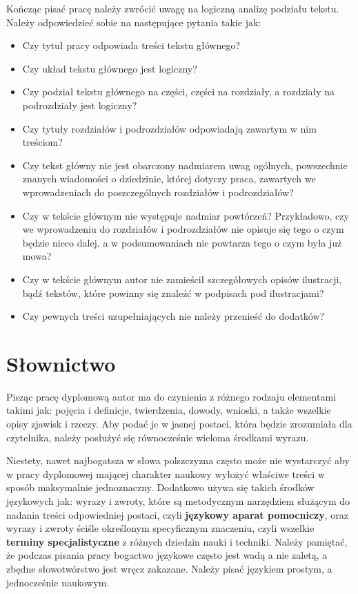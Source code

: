 Kończąc pisać pracę należy zwrócić uwagę na logiczną analizę podziału tekstu. Należy odpowiedzieć sobie na następujące pytania takie jak:
\begin{itemize}
	\item Czy tytuł pracy odpowiada treści tekstu głównego? 
	\item Czy układ tekstu głównego jest logiczny?
	\item Czy podział tekstu głównego na części, części na rozdziały, a rozdziały na podrozdziały jest logiczny?
	\item Czy tytuły rozdziałów i podrozdziałów odpowiadają zawartym w nim treściom?
	\item Czy tekst główny nie jest obarczony nadmiarem uwag ogólnych, powszechnie znanych wiadomości o dziedzinie, której dotyczy praca, zawartych we wprowadzeniach do poszczególnych rozdziałów i podrozdziałów?
	\item Czy w tekście głównym nie występuje nadmiar powtórzeń? Przykładowo, czy we wprowadzeniu do rozdziałów i podrozdziałów nie opisuje się tego o czym będzie nieco dalej, a w podsumowaniach nie powtarza tego o czym była już mowa?
	\item Czy w tekście głównym autor nie zamieścił szczegółowych opisów ilustracji, bądź tekstów, które powinny się znaleźć w podpisach pod ilustracjami?
	\item Czy pewnych treści uzupełniających nie należy przenieść do dodatków?
\end{itemize} 
\section{Słownictwo}
Pisząc pracę dyplomową autor ma do czynienia z różnego rodzaju elementami takimi jak: pojęcia i definicje, twierdzenia, dowody, wnioski, a także wszelkie opisy zjawisk i rzeczy. Aby podać je w jasnej postaci, która będzie zrozumiała dla czytelnika, należy posłużyć się równocześnie wieloma środkami wyrazu.

Niestety, nawet najbogatsza w słowa polszczyzna często może nie wystarczyć aby w pracy dyplomowej mającej charakter naukowy wyłożyć właściwe treści w sposób maksymalnie jednoznaczny. Dodatkowo używa się takich środków językowych jak: wyrazy i zwroty, które są metodycznym narzędziem służącym do nadania treści odpowiedniej postaci, czyli \textbf{językowy aparat pomocniczy}, oraz wyrazy i zwroty ściśle określonym specyficznym znaczeniu, czyli wszelkie \textbf{terminy specjalistyczne} z różnych dziedzin nauki i techniki. Należy pamiętać, że podczas pisania pracy bogactwo językowe często jest wadą a nie zaletą, a zbędne słowotwórstwo jest wręcz zakazane. Należy pisać językiem prostym, a jednocześnie naukowym.



